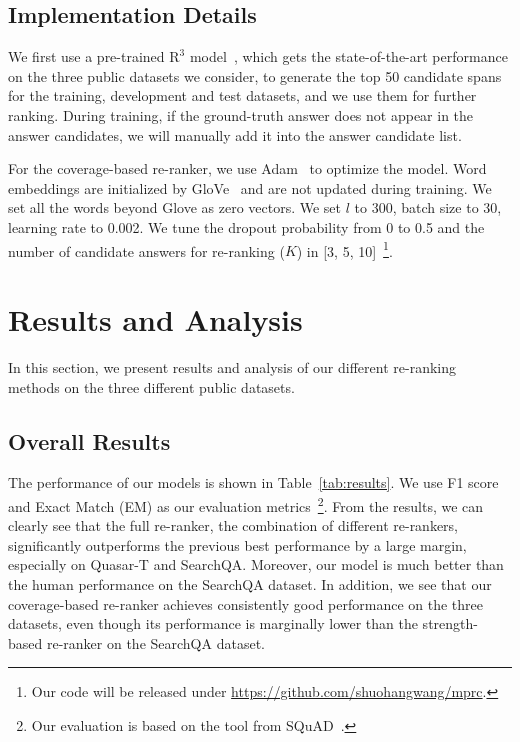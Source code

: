 \documentclass{article} \usepackage{iclr2018_conference,times}
\begin{document}
\subsection{Implementation Details}

We first use a pre-trained $\text{R}^3$ model~\citep{wang2017r}, which gets the state-of-the-art performance on the three public datasets we consider, to generate the top 50 candidate spans for the training, development and test datasets, and we use them for further ranking. During training, if the ground-truth answer does not appear in the answer candidates, we will manually add it into the answer candidate list.

For the coverage-based re-ranker, we use Adam~\citep{kingma2014adam:iclr2015} to optimize the model. Word embeddings are initialized by  GloVe~\citep{glove:emnlp2014} and are not updated during training. We set all the words beyond Glove as zero vectors. We set $l$ to 300, batch size to 30, learning rate to 0.002.  We tune the dropout probability from 0 to 0.5 and the number of candidate answers for re-ranking ($K$) in [3, 5, 10]~\footnote{Our code will be released under \url{https://github.com/shuohangwang/mprc}.}.




\section{Results and Analysis}

In this section, we present results and analysis of our different re-ranking methods on the three different public datasets.

\subsection{Overall Results}

The performance of our models is shown in Table~\ref{tab:results}. We use F1 score and Exact Match (EM) as our evaluation metrics~\footnote{Our evaluation is based on the tool from SQuAD~\citep{rajpurkar2016squad}.}.  
From the results, we can clearly see that the full re-ranker, the combination of different re-rankers, significantly outperforms the previous best performance by a large margin, especially on Quasar-T and SearchQA. Moreover, our model is much better than the human performance on the SearchQA dataset. In addition, we see that our coverage-based re-ranker achieves consistently good performance on the three datasets, even though its performance is marginally lower than the strength-based re-ranker on the SearchQA dataset.
\end{document}
